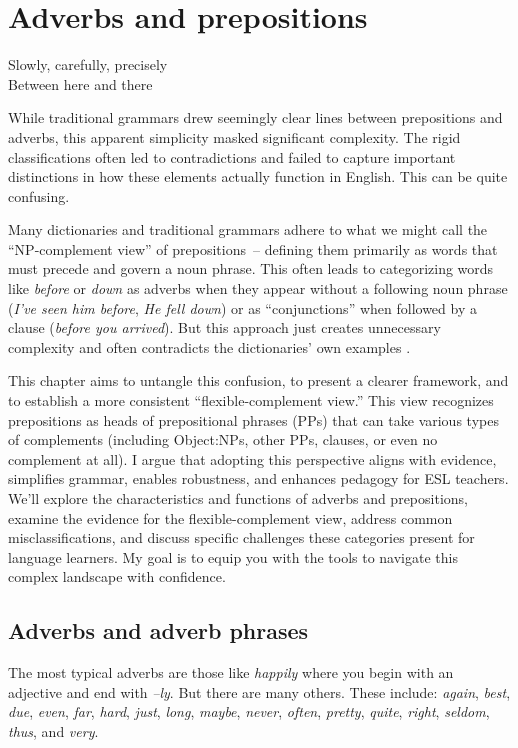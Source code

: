 \chapter{Adverbs and prepositions}

\epigraph{Slowly, carefully, precisely\\Between here and there}{}

\noindent
While traditional grammars drew seemingly clear lines between prepositions and adverbs, this apparent simplicity masked significant complexity. The rigid classifications often led to contradictions and failed to capture important distinctions in how these elements actually function in English. This can be quite confusing.

Many dictionaries and traditional grammars adhere to what we might call the ``NP-complement view'' of prepositions~-- defining them primarily as words that must precede and govern a noun phrase. This often leads to categorizing words like \textit{before} or \textit{down} as adverbs when they appear without a following noun phrase (\textit{I've seen him before}, \textit{He fell down}) or as ``conjunctions'' when followed by a clause (\textit{before you arrived}). But this approach just creates unnecessary complexity and often contradicts the dictionaries' own examples \autocite{reynolds2025}.

This chapter aims to untangle this confusion, to present a clearer framework, and to establish a more consistent ``flexible-complement view.'' This view recognizes prepositions as heads of prepositional phrases (PPs) that can take various types of complements (including Object:NPs, other PPs, clauses, or even no complement at all).  I argue that adopting this perspective aligns with evidence, simplifies grammar, enables robustness, and enhances pedagogy for ESL teachers. We'll explore the characteristics and functions of adverbs and prepositions, examine the evidence for the flexible-complement view, address common misclassifications, and discuss specific challenges these categories present for language learners. My goal is to equip you with the tools to navigate this complex landscape with confidence.

\section{Adverbs and adverb phrases}
The most typical adverbs are those like \textit{happily} where you begin with an adjective and end with \textit{--ly}. But there are many others. These include: \textit{again}, \textit{best}, \textit{due}, \textit{even}, \textit{far}, \textit{hard}, \textit{just}, \textit{long}, \textit{maybe}, \textit{never}, \textit{often}, \textit{pretty}, \textit{quite}, \textit{right}, \textit{seldom}, \textit{thus}, and \textit{very}.

